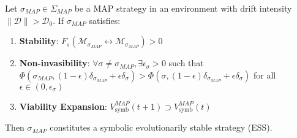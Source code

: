 \begin{proposition}
\label{prop:bk5_symbolic_ess_via_map_observability_variant}
Let $\sigma_{MAP} \in \Sigma_{MAP}$ be a MAP strategy in an environment with drift intensity $\|\mathcal{D}\| > \mathcal{D}_0$. If $\sigma_{MAP}$ satisfies:
\begin{enumerate}
    \item \textbf{Stability}: $F_s(\mathscr{M}_{\sigma_{MAP}} \leftrightarrow \mathscr{M}_{\sigma_{MAP}}) > 0$
    \item \textbf{Non-invasibility}: $\forall \sigma \neq \sigma_{MAP}, \exists \epsilon_\sigma > 0$ such that 
    $\Phi(\sigma_{MAP}, (1-\epsilon)\delta_{\sigma_{MAP}} + \epsilon\delta_\sigma) > \Phi(\sigma, (1-\epsilon)\delta_{\sigma_{MAP}} + \epsilon\delta_\sigma)$ for all $\epsilon \in (0, \epsilon_\sigma)$
    \item \textbf{Viability Expansion}: $V_{\text{symb}}^{MAP}(t+1) \supset V_{\text{symb}}^{MAP}(t)$
\end{enumerate}
Then $\sigma_{MAP}$ constitutes a symbolic evolutionarily stable strategy (ESS).
\end{proposition}
